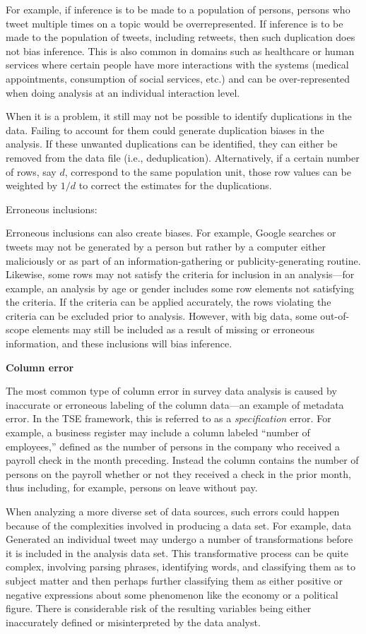 \documentclass[]{krantz}
\begin{document}
For example, if inference is to be made to a population of persons,
persons who tweet multiple times on a topic would be overrepresented. If
inference is to be made to the population of tweets, including retweets,
then such duplication does not bias inference. This is also common in
domains such as healthcare or human services where certain people have
more interactions with the systems (medical appointments, consumption of
social services, etc.) and can be over-represented when doing analysis
at an individual interaction level.

When it is a problem, it still may not be possible to identify
duplications in the data. Failing to account for them could generate
duplication biases in the analysis. If these unwanted duplications can
be identified, they can either be removed from the data file (i.e.,
deduplication). Alternatively, if a certain number of rows, say \(d\),
correspond to the same population unit, those row values can be weighted
by \(1/d\) to correct the estimates for the duplications.

Erroneous inclusions:

Erroneous inclusions can also create biases. For example, Google
searches or tweets may not be generated by a person but rather by a
computer either maliciously or as part of an information-gathering or
publicity-generating routine. Likewise, some rows may not satisfy the
criteria for inclusion in an analysis---for example, an analysis by age
or gender includes some row elements not satisfying the criteria. If the
criteria can be applied accurately, the rows violating the criteria can
be excluded prior to analysis. However, with big data, some out-of-scope
elements may still be included as a result of missing or erroneous
information, and these inclusions will bias inference.

\textbf{Column error}

The most common type of column error in survey data analysis is caused
by inaccurate or erroneous labeling of the column data---an example of
metadata error. In the TSE framework, this is referred to as a
\emph{specification} error. For example, a business register may include
a column labeled ``number of employees,'' defined as the number of
persons in the company who received a payroll check in the month
preceding. Instead the column contains the number of persons on the
payroll whether or not they received a check in the prior month, thus
including, for example, persons on leave without pay.

When analyzing a more diverse set of data sources, such errors could
happen because of the complexities involved in producing a data set. For
example, data Generated an individual tweet may undergo a number of
transformations before it is included in the analysis data set. This
transformative process can be quite complex, involving parsing phrases,
identifying words, and classifying them as to subject matter and then
perhaps further classifying them as either positive or negative
expressions about some phenomenon like the economy or a political
figure. There is considerable risk of the resulting variables being
either inaccurately defined or misinterpreted by the data analyst.
\end{document}
